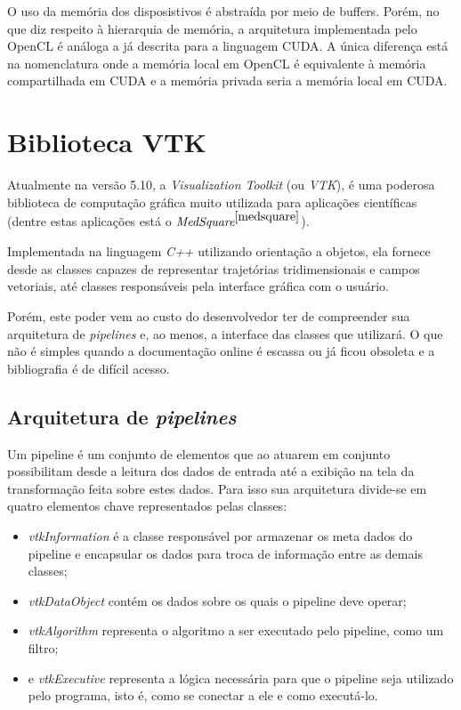   O uso da memória dos disposistivos é abstraída por meio de buffers. Porém, no que diz respeito à hierarquia de memória, a arquitetura implementada pelo OpenCL é análoga a já descrita para a linguagem CUDA. A única diferença está na nomenclatura onde a memória local em OpenCL é equivalente à memória compartilhada em CUDA e a memória privada seria a memória local em CUDA. 
  
\section{Biblioteca VTK}
Atualmente na versão 5.10, a \textit{Visualization Toolkit} (ou \textit{VTK}), é uma poderosa biblioteca de computação gráfica muito utilizada para aplicações científicas (dentre estas aplicações está o  $\textit{MedSquare}^{\ref{medsquare}}$).

Implementada na linguagem \textit{C++} utilizando orientação a objetos, ela fornece desde as classes capazes de representar trajetórias tridimensionais e campos vetoriais, até classes responsáveis pela interface gráfica com o usuário.

Porém, este poder vem ao custo do desenvolvedor ter de compreender sua arquitetura de \textit{pipelines} e, ao menos, a interface das classes que utilizará. O que não é simples quando a documentação online é escassa ou já ficou obsoleta e a bibliografia é de difícil acesso.

  \subsection{Arquitetura de \textit{pipelines}}
  Um pipeline é um conjunto de elementos que ao atuarem em conjunto possibilitam desde a leitura dos dados de entrada até a exibição na tela da transformação feita sobre estes dados. Para isso sua arquitetura divide-se em quatro elementos chave representados pelas classes:
  \begin{itemize}
    \item \textit{vtkInformation} é a classe responsável por armazenar os meta dados do pipeline e encapsular os dados para troca de informação entre as demais classes;
    \item \textit{vtkDataObject} contém os dados sobre os quais o pipeline deve operar;
    \item \textit{vtkAlgorithm} representa o algoritmo a ser executado pelo pipeline, como um filtro;
    \item e \textit{vtkExecutive} representa a lógica necessária para que o pipeline seja utilizado pelo programa, isto é, como se conectar a ele e como executá-lo.
  \end{itemize} 

